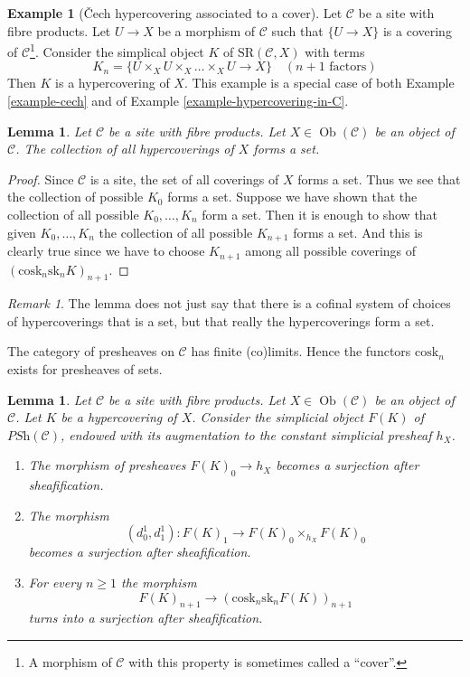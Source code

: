 \documentclass[10pt,a4paper]{article}
\theoremstyle{plain}
\newtheorem{lemma}[subsection]{Lemma}
\theoremstyle{definition}
\newtheorem{example}[subsection]{Example}
\theoremstyle{remark}
\newtheorem{remark}[subsection]{Remark}
\numberwithin{equation}{subsection}
\def\Ob{\mathop{\mathrm{Ob}}\nolimits}
\begin{document}
\begin{example}[{\v C}ech hypercovering associated to a cover]
\label{example-cech-cover}
Let $\mathcal{C}$ be a site with fibre products. Let $U \to X$ be a
morphism of $\mathcal{C}$ such that $\{U \to X\}$ is a covering of
$\mathcal{C}$\footnote{A morphism of $\mathcal{C}$ with this property
is sometimes called a ``cover''.}. Consider the simplical object $K$ of
$\text{SR}(\mathcal{C}, X)$ with terms
$$
K_n = \{U \times_X U \times_X \ldots \times_X U \to X\}
\quad (n + 1 \text{ factors})
$$
Then $K$ is a hypercovering of $X$. This example is a special case of both
Example \ref{example-cech} and of
Example \ref{example-hypercovering-in-C}.
\end{example}

\begin{lemma}
\label{lemma-hypercoverings-set}
Let $\mathcal{C}$ be a site with fibre products.
Let $X \in \Ob(\mathcal{C})$ be an object of $\mathcal{C}$.
The collection of all hypercoverings of $X$ forms a set.
\end{lemma}

\begin{proof}
Since $\mathcal{C}$ is a site, the set of all coverings of
$X$ forms a set. Thus we see that the collection
of possible $K_0$ forms a set. Suppose we have shown that
the collection of all possible $K_0, \ldots, K_n$ form
a set. Then it is enough to show that given
$K_0, \ldots, K_n$ the collection of all possible
$K_{n + 1}$ forms a set. And this is clearly true since
we have to choose $K_{n + 1}$ among all possible coverings
of $(\text{cosk}_n \text{sk}_n K)_{n + 1}$.
\end{proof}

\begin{remark}
\label{remark-hypercoverings-really-set}
The lemma does not just say that there is a cofinal
system of choices of hypercoverings that is a set,
but that really the hypercoverings form a set.
\end{remark}

\noindent
The category of presheaves on $\mathcal{C}$ has
finite (co)limits. Hence the functors $\text{cosk}_n$
exists for presheaves of sets.

\begin{lemma}
\label{lemma-hypercovering-F}
Let $\mathcal{C}$ be a site with fibre products.
Let $X \in \Ob(\mathcal{C})$ be an object of $\mathcal{C}$.
Let $K$ be a hypercovering of $X$.
Consider the simplicial object $F(K)$ of $\textit{PSh}(\mathcal{C})$,
endowed with its augmentation to the constant simplicial presheaf $h_X$.
\begin{enumerate}
\item The morphism of presheaves $F(K)_0 \to h_X$ becomes
a surjection after sheafification.
\item The morphism
$$
(d^1_0, d^1_1) :
F(K)_1
\longrightarrow
F(K)_0 \times_{h_X} F(K)_0
$$
becomes a surjection after sheafification.
\item For every $n \geq 1$ the morphism
$$
F(K)_{n + 1} \longrightarrow (\text{cosk}_n \text{sk}_n F(K))_{n + 1}
$$
turns into a surjection after sheafification.
\end{enumerate}
\end{lemma}
\end{document}

